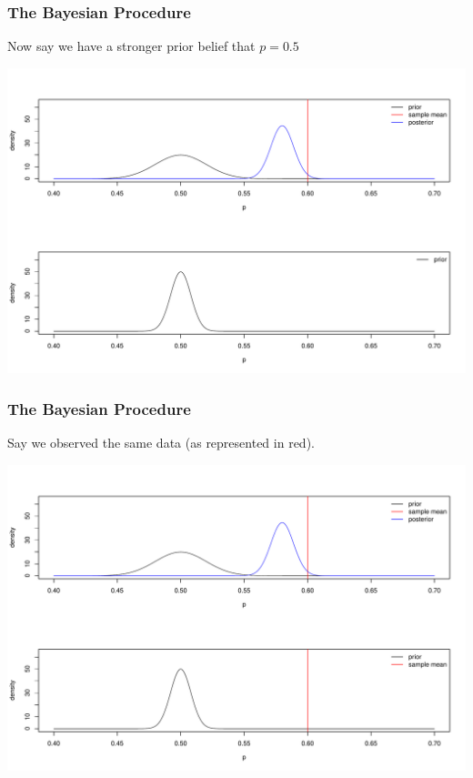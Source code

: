 \documentclass[slides]{beamer}
\begin{document}
\begin{frame}
\frametitle{The Bayesian Procedure}
Now say we have a stronger prior belief that $p=0.5$
\begin{center}
\includegraphics[width=\textwidth]{figure/bayes4.pdf} 
\end{center}

\end{frame}


\begin{frame}
\frametitle{The Bayesian Procedure}
Say we observed the same data (as represented in red).
\begin{center}
\includegraphics[width=\textwidth]{figure/bayes5.pdf} 
\end{center}

\end{frame}
\end{document}
